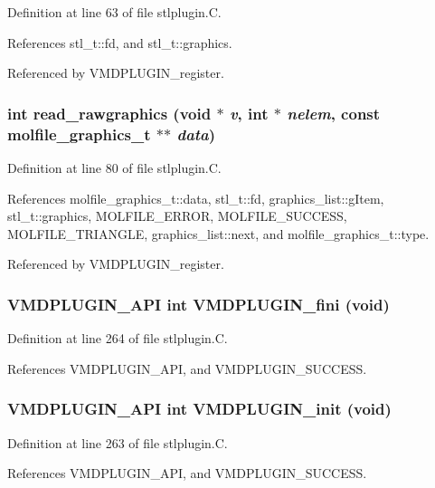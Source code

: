 Definition at line 63 of file stlplugin.C.

References stl\_\-t::fd, and stl\_\-t::graphics.

Referenced by VMDPLUGIN\_\-register.
\subsubsection{\setlength{\rightskip}{0pt plus 5cm}int read\_\-rawgraphics (void $\ast$ {\em v}, int $\ast$ {\em nelem}, const {\bf molfile\_\-graphics\_\-t} $\ast$$\ast$ {\em data})\hspace{0.3cm}{\tt  [static]}}\label{stlplugin_8C_a3}




Definition at line 80 of file stlplugin.C.

References molfile\_\-graphics\_\-t::data, stl\_\-t::fd, graphics\_\-list::g\-Item, stl\_\-t::graphics, MOLFILE\_\-ERROR, MOLFILE\_\-SUCCESS, MOLFILE\_\-TRIANGLE, graphics\_\-list::next, and molfile\_\-graphics\_\-t::type.

Referenced by VMDPLUGIN\_\-register.
\subsubsection{\setlength{\rightskip}{0pt plus 5cm}VMDPLUGIN\_\-API int VMDPLUGIN\_\-fini (void)}\label{stlplugin_8C_a6}




Definition at line 264 of file stlplugin.C.

References VMDPLUGIN\_\-API, and VMDPLUGIN\_\-SUCCESS.
\subsubsection{\setlength{\rightskip}{0pt plus 5cm}VMDPLUGIN\_\-API int VMDPLUGIN\_\-init (void)}\label{stlplugin_8C_a5}




Definition at line 263 of file stlplugin.C.

References VMDPLUGIN\_\-API, and VMDPLUGIN\_\-SUCCESS.
